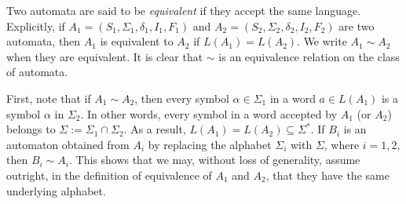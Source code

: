 \documentclass[12pt]{article}
\begin{document}
Two automata are said to be \emph{equivalent} if they accept the same language.  Explicitly, if $A_1=(S_1,\Sigma_1,\delta_1,I_1,F_1)$ and $A_2=(S_2,\Sigma_2,\delta_2,I_2,F_2)$ are two automata, then $A_1$ is equivalent to $A_2$ if $L(A_1)=L(A_2)$.  We write $A_1\sim A_2$ when they are equivalent.  It is clear that $\sim$ is an equivalence relation on the class of automata.

First, note that if $A_1\sim A_2$, then every symbol $\alpha\in \Sigma_1$ in a word $a\in L(A_1)$ is a symbol $\alpha$ in $\Sigma_2$.  In other words, every symbol in a word accepted by $A_1$ (or $A_2$) belongs to $\Sigma:=\Sigma_1\cap \Sigma_2$.  As a result, $L(A_1)=L(A_2)\subseteq \Sigma^*$.  If $B_i$ is an automaton obtained from $A_i$ by replacing the alphabet $\Sigma_i$ with $\Sigma$, where $i=1,2$, then $B_i\sim A_i$.  This shows that we may, without loss of generality, assume outright, in the definition of equivalence of $A_1$ and $A_2$, that they have the same underlying alphabet.
\end{document}

